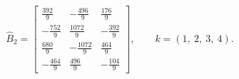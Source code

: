 \newcommand{\GeneratedEndpointCoefficientMatrix}{\widehat B}
\[
\GeneratedEndpointCoefficientMatrix_2=\left[\begin{matrix}\frac{392}{9} & - \frac{496}{9} & \frac{176}{9}\\- \frac{752}{9} & \frac{1072}{9} & - \frac{392}{9}\\\frac{680}{9} & - \frac{1072}{9} & \frac{464}{9}\\- \frac{464}{9} & \frac{496}{9} & - \frac{104}{9}\end{matrix}\right],\qquad k=\left( 1, \  2, \  3, \  4\right).
\]
